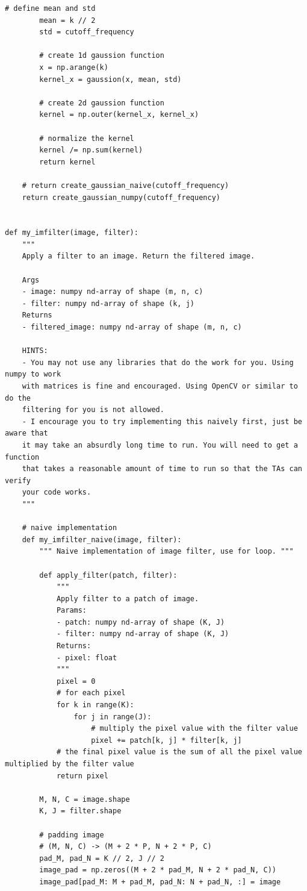 \begin{lstlisting}[style=Python]
        # define mean and std
        mean = k // 2
        std = cutoff_frequency
        
        # create 1d gaussion function
        x = np.arange(k)
        kernel_x = gaussion(x, mean, std)
        
        # create 2d gaussion function
        kernel = np.outer(kernel_x, kernel_x)
        
        # normalize the kernel
        kernel /= np.sum(kernel)
        return kernel

    # return create_gaussian_naive(cutoff_frequency)
    return create_gaussian_numpy(cutoff_frequency)


def my_imfilter(image, filter):
    """
    Apply a filter to an image. Return the filtered image.

    Args
    - image: numpy nd-array of shape (m, n, c)
    - filter: numpy nd-array of shape (k, j)
    Returns
    - filtered_image: numpy nd-array of shape (m, n, c)

    HINTS:
    - You may not use any libraries that do the work for you. Using numpy to work
    with matrices is fine and encouraged. Using OpenCV or similar to do the
    filtering for you is not allowed.
    - I encourage you to try implementing this naively first, just be aware that
    it may take an absurdly long time to run. You will need to get a function
    that takes a reasonable amount of time to run so that the TAs can verify
    your code works.
    """
    
    # naive implementation
    def my_imfilter_naive(image, filter):
        """ Naive implementation of image filter, use for loop. """
        
        def apply_filter(patch, filter):
            """
            Apply filter to a patch of image.
            Params:
            - patch: numpy nd-array of shape (K, J)
            - filter: numpy nd-array of shape (K, J)
            Returns:
            - pixel: float
            """
            pixel = 0
            # for each pixel
            for k in range(K):
                for j in range(J):
                    # multiply the pixel value with the filter value
                    pixel += patch[k, j] * filter[k, j]
            # the final pixel value is the sum of all the pixel value multiplied by the filter value
            return pixel
        
        M, N, C = image.shape
        K, J = filter.shape

        # padding image
        # (M, N, C) -> (M + 2 * P, N + 2 * P, C)
        pad_M, pad_N = K // 2, J // 2
        image_pad = np.zeros((M + 2 * pad_M, N + 2 * pad_N, C))
        image_pad[pad_M: M + pad_M, pad_N: N + pad_N, :] = image


\end{lstlisting}
